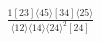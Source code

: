 \documentclass[varwidth, border=5pt]{standalone}
\begin{document}
\begin{my}
$\begin{gathered}
\scriptscriptstyle\frac{1[23]⟨45⟩[34]⟨25⟩}{⟨12⟩⟨14⟩⟨24⟩^2[24]}
\end{gathered}$
\end{my}
\end{document}
